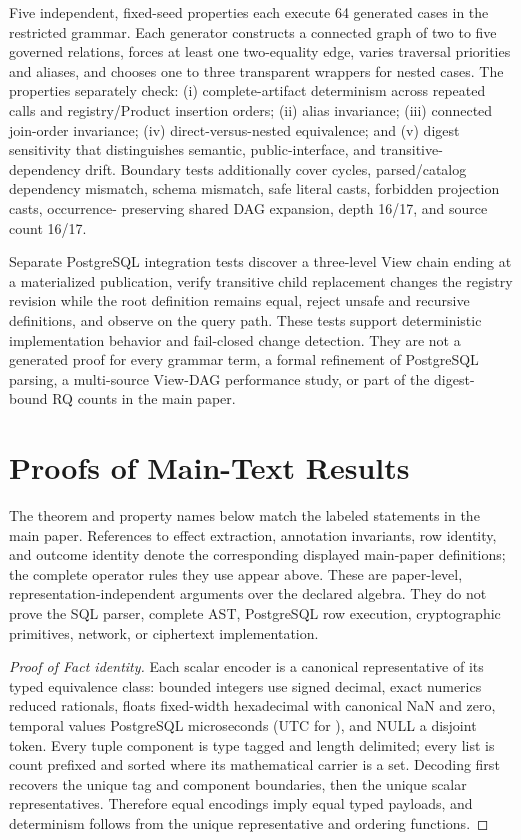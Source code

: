 \documentclass[journal,onecolumn]{IEEEtran}
\newcommand{\code}[1]{\texttt{\detokenize{#1}}}
\begin{document}
Five independent, fixed-seed \code{testing/quick} properties each execute 64
generated cases in the restricted grammar. Each generator constructs a
connected graph of two to five governed relations, forces at least one
two-equality edge, varies traversal priorities and aliases, and chooses one to
three transparent wrappers for nested cases. The properties separately check:
(i) complete-artifact determinism across repeated calls and registry/Product
insertion orders; (ii) alias invariance; (iii) connected join-order invariance;
(iv) direct-versus-nested equivalence; and (v) digest sensitivity that
distinguishes semantic, public-interface, and transitive-dependency drift.
Boundary tests additionally cover cycles, parsed/catalog dependency mismatch,
schema mismatch, safe literal casts, forbidden projection casts, occurrence-
preserving shared DAG expansion, depth 16/17, and source count 16/17.

Separate PostgreSQL integration tests discover a three-level View chain ending
at a materialized publication, verify transitive child replacement changes the
registry revision while the root definition remains equal, reject unsafe and
recursive definitions, and observe \code{repeatable read} on the query path.
These tests support deterministic implementation behavior and fail-closed
change detection. They are not a generated proof for every grammar term, a
formal refinement of PostgreSQL parsing, a multi-source View-DAG performance
study, or part of the digest-bound RQ counts in the main paper.

\section{Proofs of Main-Text Results}
\label{sec:supp-proofs}

The theorem and property names below match the labeled statements in the main
paper. References to effect extraction, annotation invariants, row identity,
and outcome identity denote the corresponding displayed main-paper
definitions; the complete operator rules they use appear above. These are
paper-level, representation-independent arguments over the declared algebra.
They do not prove the SQL parser, complete AST, PostgreSQL row execution,
cryptographic primitives, network, or ciphertext implementation.

\begin{proof}[Proof of Fact identity]
Each scalar encoder is a canonical representative of its typed equivalence
class: bounded integers use signed decimal, exact numerics reduced rationals,
floats fixed-width hexadecimal with canonical NaN and zero, temporal values
PostgreSQL microseconds (UTC for \code{timestamptz}), and NULL a disjoint token.
Every tuple component is type tagged and length delimited; every list is count
prefixed and sorted where its mathematical carrier is a set. Decoding first
recovers the unique tag and component boundaries, then the unique scalar
representatives. Therefore equal encodings imply equal typed payloads, and
determinism follows from the unique representative and ordering functions.
\end{proof}
\end{document}
